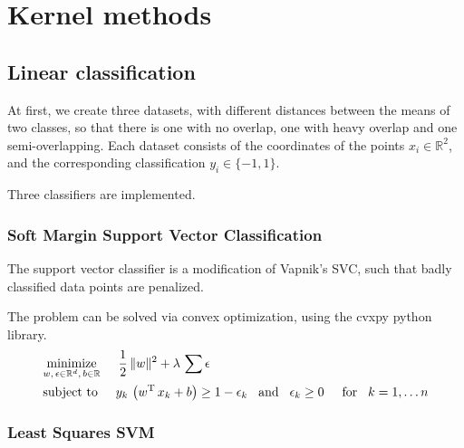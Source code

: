 \section{Kernel methods}

\subsection{Linear classification}

At first, we create three datasets, with different distances between
the means of two classes, so that there is one with no overlap,
one with heavy overlap and one semi-overlapping.
Each dataset consists of the coordinates of the points $x_i\in\mathbb{R}^2$,
and the corresponding classification $y_i\in\{-1, 1\}$.

Three classifiers are implemented.

\subsubsection*{Soft Margin Support Vector Classification}


The support vector classifier is a modification of Vapnik's SVC, such that
badly classified data points are penalized.

The problem can be solved via convex optimization, using the cvxpy python library.
\begin{equation}
\begin{split}
	&\underset{w,\,\epsilon\in\mathbb{R}^d,\,b\in\mathbb{R}}{\operatorname{minimize}}\hspace{5mm}
		\frac{1}{2}\,\lVert w\rVert^2 + \lambda\,\sum\epsilon\\
	&\text{subject to}\hspace{5mm}
		y_k\,\left(w\textsuperscript{T}\,x_k + b\right)\geq1-\epsilon_k\hspace{3mm}\text{and}\hspace{3mm}\epsilon_k\geq0\hspace{5mm}\text{for}\hspace{3mm} k=1,\dots n
\end{split}
\end{equation}

\subsubsection*{Least Squares SVM}


